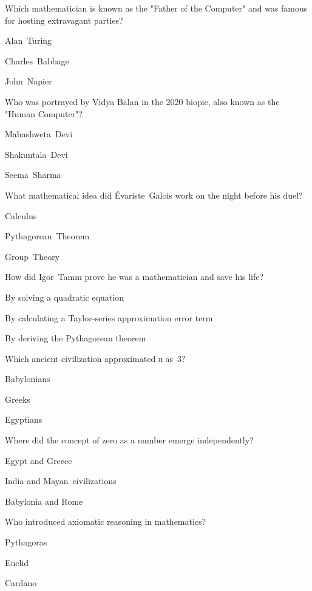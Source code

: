 
\begin{enhancedmcq}{Which mathematician is known as the "Father of the Computer" and was famous for hosting extravagant parties?}
\item Alan Turing
\item Charles Babbage
\item John Napier

\end{enhancedmcq}
\begin{enhancedmcq}{Who was portrayed by Vidya Balan in the 2020 biopic, also known as the "Human Computer"?}
\item Mahashweta Devi
\item Shakuntala Devi
\item Seema Sharma

\end{enhancedmcq}
\begin{enhancedmcq}{What mathematical idea did Évariste Galois work on the night before his duel?}
\item Calculus
\item Pythagorean Theorem
\item Group Theory

\end{enhancedmcq}
\begin{enhancedmcq}{How did Igor Tamm prove he was a mathematician and save his life?}
\item By solving a quadratic equation
\item By calculating a Taylor‑series approximation error term
\item By deriving the Pythagorean theorem

\end{enhancedmcq}
\begin{enhancedmcq}{Which ancient civilization approximated π as 3?}
\item Babylonians
\item Greeks
\item Egyptians

\end{enhancedmcq}
\begin{enhancedmcq}{Where did the concept of zero as a number emerge independently?}
\item Egypt and Greece
\item India and Mayan civilizations
\item Babylonia and Rome

\end{enhancedmcq}
\begin{enhancedmcq}{Who introduced axiomatic reasoning in mathematics?}
\item Pythagoras
\item Euclid
\item Cardano

\end{enhancedmcq}

